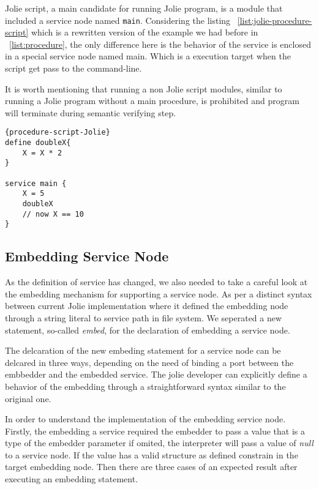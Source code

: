 Jolie script, a main candidate for running Jolie program, is a module that included a service node named \texttt{main}. Considering the listing ~\ref{list:jolie-procedure-script} which is a rewritten version of the example we had before in ~\ref{list:procedure}, the only difference here is the behavior of the service is enclosed in a special service node named main. Which is a execution target when the script get pass to the command-line.

It is worth mentioning that running a non Jolie script modules, similar to running a Jolie program without a main procedure, is prohibited and program will terminate during semantic verifying step.

\begin{listing}[h]
    \lstset{language=Jolie,
        style=codeStyle
    }
\begin{lstlisting}[frame=tlrb, caption= {A Jolie script version of ~\ref{list:procedure}}, label={list:jolie-procedure-script}]{procedure-script-Jolie}
define doubleX{
    X = X * 2
}

service main {
    X = 5
    doubleX
    // now X == 10
}
\end{lstlisting}
\end{listing}

\subsection{Embedding Service Node}

As the definition of service has changed, we also needed to take a careful look at the embedding mechanism for supporting a service node. As per a distinct syntax between current Jolie implementation where it defined the embedding node through a string literal to service path in file system. We seperated a new statement, so-called \textit{embed}, for the declaration of embedding a service node. 

The delcaration of the new embeding statement for a service node can be delcared in three ways, depending on the need of binding a port between the embbedder and the embedded service. The jolie developer can explicitly define a behavior of the embedding through a straightforward syntax similar to the original one. 

In order to understand the implementation of the embedding service node. Firstly, the embedding a service required the embedder to pass a value that is a type of the embedder parameter if omited, the interpreter will pass a value of \textit{null} to a service node. If the value has a valid structure as defined constrain in the target embedding node. Then there are three cases of an expected result after executing an embedding statement.

